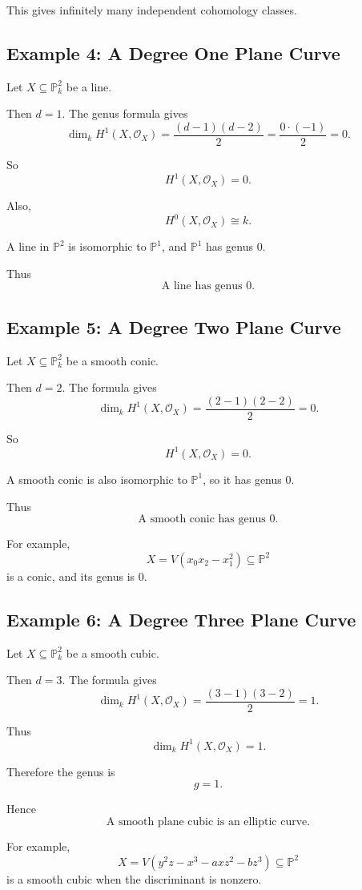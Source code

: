 \documentclass[12pt,a4paper]{article}
\theoremstyle{notespace}
\begin{document}
This gives infinitely many independent cohomology classes.

\subsection{Example 4: A Degree One Plane Curve}

Let $X\subseteq\mathbb P_k^2$ be a line.

Then $d=1$. The genus formula gives
\[
\dim_k H^1(X,\mathcal O_X)
=
\frac{(d-1)(d-2)}2
=
\frac{0\cdot(-1)}2
=
0.
\]

So
\[
H^1(X,\mathcal O_X)=0.
\]

Also,
\[
H^0(X,\mathcal O_X)\cong k.
\]

A line in $\mathbb P^2$ is isomorphic to $\mathbb P^1$, and $\mathbb P^1$
has genus $0$.

Thus
\[
\boxed{
	\text{A line has genus }0.
}
\]

\subsection{Example 5: A Degree Two Plane Curve}

Let $X\subseteq\mathbb P_k^2$ be a smooth conic.

Then $d=2$. The formula gives
\[
\dim_k H^1(X,\mathcal O_X)
=
\frac{(2-1)(2-2)}2
=
0.
\]

So
\[
H^1(X,\mathcal O_X)=0.
\]

A smooth conic is also isomorphic to $\mathbb P^1$, so it has genus $0$.

Thus
\[
\boxed{
	\text{A smooth conic has genus }0.
}
\]

For example,
\[
X=V(x_0x_2-x_1^2)\subseteq\mathbb P^2
\]
is a conic, and its genus is $0$.

\subsection{Example 6: A Degree Three Plane Curve}

Let $X\subseteq\mathbb P_k^2$ be a smooth cubic.

Then $d=3$. The formula gives
\[
\dim_k H^1(X,\mathcal O_X)
=
\frac{(3-1)(3-2)}2
=
1.
\]

Thus
\[
\dim_k H^1(X,\mathcal O_X)=1.
\]

Therefore the genus is
\[
g=1.
\]

Hence
\[
\boxed{
	\text{A smooth plane cubic is an elliptic curve.}
}
\]

For example,
\[
X=V(y^2z-x^3-axz^2-bz^3)
\subseteq\mathbb P^2
\]
is a smooth cubic when the discriminant is nonzero.
\end{document}
